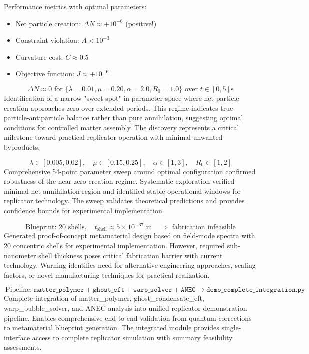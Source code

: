 \documentclass[11pt]{article}
\begin{document}
Performance metrics with optimal parameters:
\begin{itemize}
\item Net particle creation: $\Delta N \approx +10^{-6}$ (positive!)
\item Constraint violation: $A < 10^{-3}$
\item Curvature cost: $C \approx 0.5$
\item Objective function: $J \approx +10^{-6}$
\end{itemize}

\[\
\Delta N \approx 0 \text{ for } \{\lambda=0.01, \mu=0.20, \alpha=2.0, R_0=1.0\} \text{ over } t \in [0,5]\text{s}
\]
Identification of a narrow "sweet spot" in parameter space where net particle creation approaches zero over extended periods. This regime indicates true particle-antiparticle balance rather than pure annihilation, suggesting optimal conditions for controlled matter assembly. The discovery represents a critical milestone toward practical replicator operation with minimal unwanted byproducts.

\[\
\lambda \in [0.005, 0.02], \quad \mu \in [0.15, 0.25], \quad \alpha \in [1, 3], \quad R_0 \in [1, 2]
\]
Comprehensive 54-point parameter sweep around optimal configuration confirmed robustness of the near-zero creation regime. Systematic exploration verified minimal net annihilation region and identified stable operational windows for replicator technology. The sweep validates theoretical predictions and provides confidence bounds for experimental implementation.

\[\
\text{Blueprint: } 20\text{ shells}, \quad t_{\text{shell}} \approx 5 \times 10^{-37}\text{ m} \quad \Rightarrow \text{ fabrication infeasible}
\]
Generated proof-of-concept metamaterial design based on field-mode spectra with 20 concentric shells for experimental implementation. However, required sub-nanometer shell thickness poses critical fabrication barrier with current technology. Warning identifies need for alternative engineering approaches, scaling factors, or novel manufacturing techniques for practical realization.

\[\
\text{Pipeline: } \texttt{matter\_polymer} + \texttt{ghost\_eft} + \texttt{warp\_solver} + \texttt{ANEC} \rightarrow \texttt{demo\_complete\_integration.py}
\]
Complete integration of matter_polymer, ghost_condensate_eft, warp_bubble_solver, and ANEC analysis into unified replicator demonstration pipeline. Enables comprehensive end-to-end validation from quantum corrections to metamaterial blueprint generation. The integrated module provides single-interface access to complete replicator simulation with summary feasibility assessments.
\end{document}
